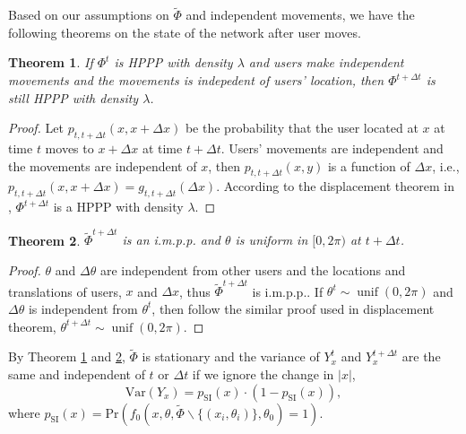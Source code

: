 \documentclass[10pt, conference, letterpaper]{IEEEtran}
\newtheorem{theorem}{Theorem}
\DeclareMathOperator*{\unif}{unif}
\begin{document}


Based on our assumptions on $\tilde{\Phi}$ and independent movements, we have the following theorems on the state of the network after user moves.

\begin{theorem}\label{theorem:hppp}
If $\Phi^t$ is HPPP with density $\lambda$ and users make independent movements and the movements is indepedent of users' location, then $\Phi^{t+\Delta t}$ is still HPPP with density $\lambda$. 
\end{theorem} 
\begin{proof}
Let $p_{t, t+\Delta t}(x, x+\Delta x)$ be the probability that the user located at $x$ at time $t$ moves to $x + \Delta x$ at time $t+\Delta t$. Users' movements are independent and the movements are independent of $x$, then $p_{t, t+\Delta t}(x, y)$ is a function of $\Delta x$, i.e., $p_{t, t+\Delta t}(x, x+\Delta x) = g_{t, t+\Delta t}(\Delta x)$.
According to the displacement theorem in \cite{poisson}, $\Phi^{t+\Delta t}$ is a HPPP with density $\lambda$.
\end{proof}

\begin{theorem}\label{theorem:hppp_orientation}
$\tilde{\Phi}^{t+\Delta t}$ is an i.m.p.p. and $\theta$ is uniform in $[0, 2\pi)$ at $t+ \Delta t$. 
\end{theorem}
\begin{proof}
	$\theta$ and $\Delta \theta$ are independent from other users and the locations and translations of users, $x$ and $\Delta x$, thus $\tilde{\Phi}^{t+\Delta t}$ is i.m.p.p.. If $\theta^t\sim \unif(0, 2\pi)$ and $\Delta \theta$ is independent from $\theta^t$, then follow the similar proof used in displacement theorem, $\theta^{t + \Delta t}\sim \unif(0, 2\pi)$. 
\end{proof}

By Theorem \ref{theorem:hppp} and \ref{theorem:hppp_orientation}, $\tilde{\Phi}$ is stationary and the variance of $Y_x^t$ and $Y_x^{t+\Delta t}$ are the same and independent of $t$ or $\Delta t$ if we ignore the change in $|x|$,  
\begin{equation*}
\mathrm{Var}(Y_x)=p_{\mathrm{SI}}(x)\cdot (1-p_{\mathrm{SI}}(x)),
\end{equation*}
where $p_{\mathrm{SI}}(x)=\mathrm{Pr}(f_0(x,\theta,\tilde{\Phi}\backslash\{(x_i,\theta_i)\}, \theta_0)=1)$. 
\end{document}
